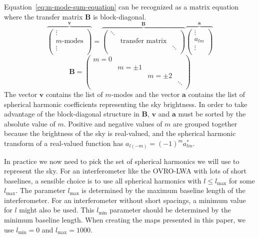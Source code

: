 \documentclass[twocolumn]{aastex61}
\newcommand{\todo}[1]{\textcolor{red}{TODO: #1}\PackageWarning{TODO:}{#1!}}
\renewcommand{\b}{\pmb}
\begin{document}
Equation~\ref{eq:m-mode-sum-equation} can be recognized as a matrix equation where the transfer
matrix $\b B$ is block-diagonal.
\begin{equation}\label{eq:m-mode-matrix-equation}
    \overbrace{\left(
        \begin{array}{c}
            \vdots \\
            m\text{-modes} \\
            \vdots \\
        \end{array}
    \right)}^{\b v}
    =
    \overbrace{\left(
        \begin{array}{ccc}
            \ddots & & \\
            & \text{transfer matrix} & \\
            & & \ddots \\
        \end{array}
    \right)}^{\b B}
    \overbrace{\left(
        \begin{array}{c}
            \vdots \\
            a_{lm} \\
            \vdots \\
        \end{array}
    \right)}^{\b a}
\end{equation}
\begin{equation}
    \b B = \left(\begin{array}{cccc}
        m = 0 &&& \\
              & m=\pm1 && \\
              && m=\pm2 & \\
              &&& \ddots \\
    \end{array}\right)
\end{equation}
The vector $\b v$ contains the list of $m$-modes and the vector $\b a$ contains the list of
spherical harmonic coefficients representing the sky brightness. In order to take advantage of the
block-diagonal structure in $\b B$, $\b v$ and $\b a$ must be sorted by the absolute value of $m$.
Positive and negative values of $m$ are grouped together because the brightness of the sky is
real-valued, and the spherical harmonic transform of a real-valued function has $a_{l(-m)} = (-1)^m
a_{lm}^*$.

In practice we now need to pick the set of spherical harmonics we will use to represent the sky. For
an interferometer like the OVRO-LWA with lots of short baselines, a sensible choice is to use all
spherical harmonics with $l\le l_\text{max}$ for some $l_\text{max}$. The parameter $l_\text{max}$
is determined by the maximum baseline length of the interferometer.  For an interferometer without
short spacings, a minimum value for $l$ might also be used. This $l_\text{min}$ parameter should be
determined by the minimum baseline length.  When creating the maps presented in this paper, we use
$l_\text{min} = 0$ and $l_\text{max} = 1000$. %
\end{document}

